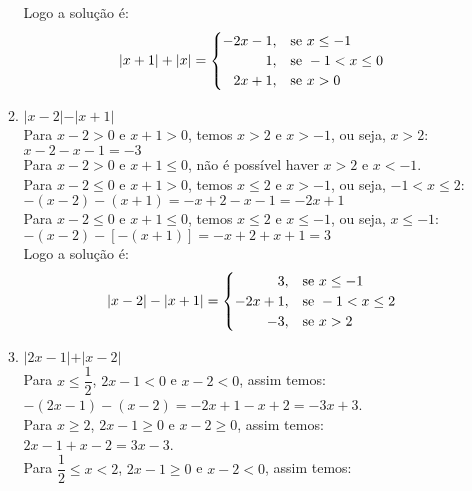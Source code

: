 \documentclass[10pt]{book}
\begin{document}
\begin{enumerate}
\begin{enumerate}
			Logo a solução é:\\
			\begin{equation*}
		    	\vert x + 1 \vert + \vert x \vert =
			    \begin{cases}
			      -2x - 1, & \text{se}\ x \leq -1 \\
			      \hfill 1, & \text{se}\ -1 < x \leq 0 \\
			      \hfill 2x + 1, & \text{se}\ x > 0 
		    	\end{cases}
			\end{equation*}
			\item %
			$\vert x - 2\vert - \vert x + 1 \vert$\\
			Para $x - 2 > 0$ e $x + 1 > 0$, temos $x > 2$ e $x > -1$, ou seja, $x > 2$:\\
			$x - 2 - x - 1 = -3$\\
			Para $x - 2 > 0$ e $x + 1 \leq 0$, não é possível haver $x > 2$ e $ x < -1$.\\
			Para $x - 2 \leq 0$ e $x + 1 > 0$, temos $x \leq 2$ e $x > -1$, ou seja, $-1 < x \leq 2$:\\
			$-(x - 2) - (x + 1) = -x + 2 - x - 1 = -2x + 1$\\
			Para $x - 2 \leq 0$ e $x + 1 \leq 0$, temos $x \leq 2$ e $x \leq -1$, ou seja, $x \leq -1$:\\
			$-(x - 2) - [-(x + 1)] = -x + 2 + x + 1 = 3$\\
			Logo a solução é:\\
			\begin{equation*}
		    	\vert x - 2 \vert - \vert x + 1 \vert =
			    \begin{cases}
			      \hfill 3, & \text{se}\ x \leq -1 \\
			      -2x + 1, & \text{se}\ -1 < x \leq 2 \\
			      \hfill -3, & \text{se}\ x > 2 
		    	\end{cases}
			\end{equation*}
			\item %
			$\vert 2x -1 \vert + \vert x -2\vert$\\
			Para $x\leq\dfrac{1}{2}$, $2x - 1 < 0$ e $x - 2 <0$, assim temos:\\
			$-(2x-1)-(x-2) = -2x+1-x+2=-3x+3$.\\
			Para $x \geq 2$, $2x - 1 \geq 0$ e $x - 2 \geq 0$, assim temos:\\
			$2x-1+x-2=3x-3$.\\
			Para $\dfrac{1}{2} \leq x < 2$, $2x - 1 \geq 0$ e $x - 2 <0$, assim temos:\\

\end{enumerate}
\end{enumerate}
\end{document}
